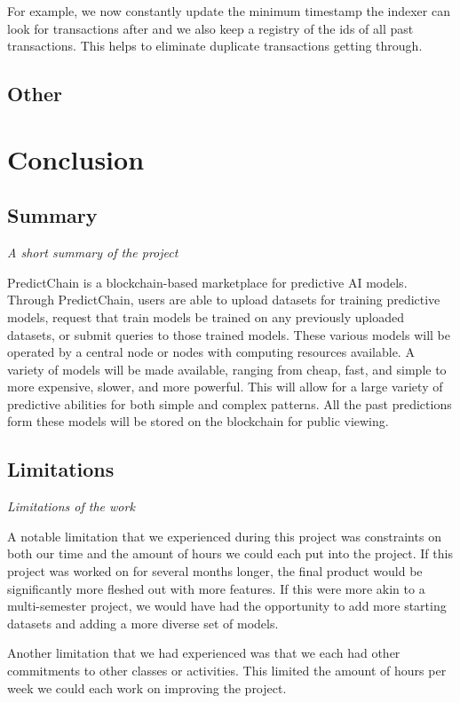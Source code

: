 \documentclass{article}
\begin{document}
    For example, we now constantly update the minimum timestamp the indexer can look for transactions after and we also
    keep a registry of the ids of all past transactions.  This helps to eliminate duplicate transactions getting through.

    \subsection{Other}

    \section{Conclusion}

    \subsection{Summary}
    \emph{A short summary of the project}

    PredictChain is a blockchain-based marketplace for predictive AI models.
    Through PredictChain, users are able to upload datasets for training predictive models, request that train models
    be trained on any previously uploaded datasets, or submit queries to those trained models.
    These various models will be operated by a central node or nodes with computing resources available. A variety of
    models will be made available, ranging from cheap, fast, and simple to more expensive, slower, and more powerful.
    This will allow for a large variety of predictive abilities for both simple and complex patterns.  All the past predictions
    form these models will be stored on the blockchain for public viewing.

    \subsection{Limitations}
    \emph{Limitations of the work}

    A notable limitation that we experienced during this project was constraints on both our time and the amount of
    hours we could each put into the project.  If this project was worked on for several months longer, the final product
    would be significantly more fleshed out with more features.  If this were more akin to a multi-semester project,
    we would have had the opportunity to add more starting datasets and adding a more diverse set of models.

    Another limitation that we had experienced was that we each had other commitments to other classes or activities.
    This limited the amount of hours per week we could each work on improving the project.
\end{document}
